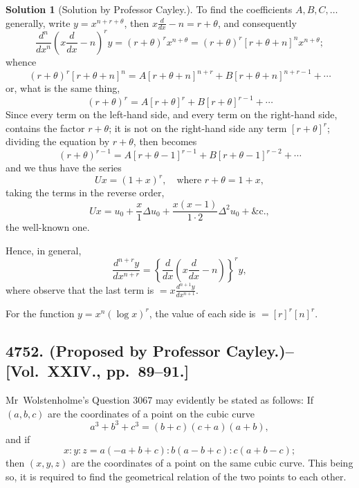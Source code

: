 \documentclass[11pt,a4paper]{article}
\theoremstyle{definition}
\newtheorem*{solution}{Solution}
\begin{document}
\begin{solution}[Solution by Professor Cayley.]
To find the coefficients $A,B,C,\ldots$ generally, write $y=x^{n+r+\theta}$, then $x\frac{d}{dx} - n = r + \theta$, and consequently
\[
\frac{d^n}{dx^n}(x\frac{d}{dx} - n)^r y = (r+\theta)^r x^{n+\theta} = (r+\theta)^r[r+\theta+n]^n x^{n+\theta};
\]
whence
\[
(r+\theta)^r[r+\theta+n]^n = A[r+\theta+n]^{n+r} + B[r+\theta+n]^{n+r-1} + \cdots
\]
or, what is the same thing,
\[
(r+\theta)^r = A[r+\theta]^r + B[r+\theta]^{r-1} + \cdots
\]
Since every term on the left-hand side, and every term on the right-hand side, contains the factor $r+\theta$; it is not on the right-hand side any term $[r+\theta]^r$; dividing the equation by $r+\theta$, then becomes
\[
(r+\theta)^{r-1} = A[r+\theta-1]^{r-1} + B[r+\theta-1]^{r-2} + \cdots
\]
and we thus have the series
\[
Ux = (1+x)^r, \quad\text{where } r+\theta = 1+x,
\]
taking the terms in the reverse order,
\[
Ux = u_0 + \frac{x}{1}\Delta u_0 + \frac{x(x-1)}{1\cdot 2}\Delta^2 u_0 + \&\text{c.},
\]
the well-known one.

Hence, in general,
\[
\frac{d^{n+r}y}{dx^{n+r}} = \left\{ \frac{d}{dx}\left(x\frac{d}{dx} - n\right) \right\}^r y,
\]
where observe that the last term is $= x\frac{d^{n+1}y}{dx^{n+1}}$.

For the function $y=x^n(\log x)^r$, the value of each side is $=[r]^r[n]^r$.
\end{solution}

\newpage

\subsection*{4752. (Proposed by Professor Cayley.)\---[Vol.~XXIV., pp.~89--91.]}

Mr~Wolstenholme's Question 3067 may evidently be stated as follows: If $(a,b,c)$ are the coordinates of a point on the cubic curve
\[
a^3 + b^3 + c^3 = (b+c)(c+a)(a+b),
\]
and if
\[
x : y : z = a(-a+b+c) : b(a-b+c) : c(a+b-c);
\]
then $(x,y,z)$ are the coordinates of a point on the same cubic curve. This being so, it is required to find the geometrical relation of the two points to each other.
\end{document}
